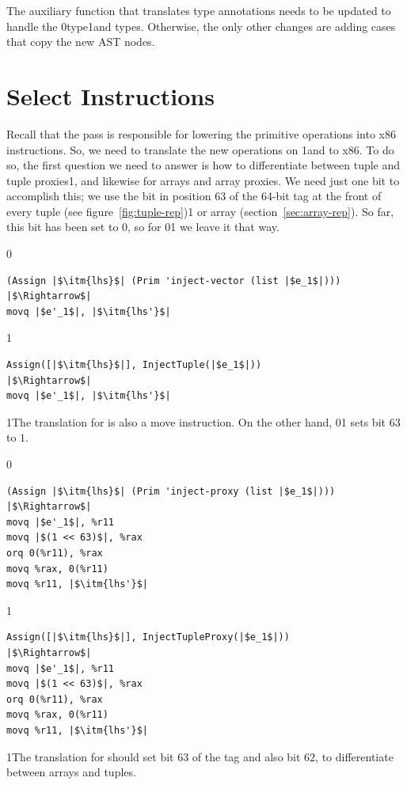 \documentclass[7x10]{TimesAPriori_MIT}%
\def\racketEd{0}
\def\pythonEd{1}
\providecommand{\BookEdition}{1}
\let\edition\BookEdition
\newcommand{\racket}[1]{{\if\edition\racketEd{#1}\fi}}
\newcommand{\pythonColor}[0]{}
\newcommand{\python}[1]{{\if\edition\pythonEd\pythonColor #1\fi}}
\numberwithin{theorem}{chapter}
\numberwithin{definition}{chapter}
\numberwithin{equation}{chapter}
\begin{document}
The auxiliary function that translates type annotations needs to be
updated to handle the \PTUPLETYNAME{}
\racket{type}\python{and \PARRAYTYNAME{} types}.
%
Otherwise, the only other changes are adding cases that copy the new
AST nodes.

\section{Select Instructions }
\label{sec:select-instructions-gradual}

Recall that the  pass is responsible for
lowering the primitive operations into x86 instructions.  So, we need
to translate the new operations on \PTUPLETYNAME{} \python{and \PARRAYTYNAME{}}
to x86.  To do so, the first question we need to answer is how to
differentiate between tuple and tuple proxies\python{, and likewise for
arrays and array proxies}.  We need just one bit to accomplish this;
we use the bit in position $63$ of the 64-bit tag at the front of
every tuple (see figure~\ref{fig:tuple-rep})\python{ or array
(section~\ref{sec:array-rep})}. So far, this bit has been set to $0$,
so for \racket{}\python{} we leave
it that way.
{\if\edition\racketEd    
\begin{lstlisting}
(Assign |$\itm{lhs}$| (Prim 'inject-vector (list |$e_1$|)))
|$\Rightarrow$|  
movq |$e'_1$|, |$\itm{lhs'}$|
\end{lstlisting}
\fi}
{\if\edition\pythonEd\pythonColor    
\begin{lstlisting}
Assign([|$\itm{lhs}$|], InjectTuple(|$e_1$|))
|$\Rightarrow$|  
movq |$e'_1$|, |$\itm{lhs'}$|
\end{lstlisting}
\fi}
\python{The translation for  is also a move instruction.}
\noindent On the other hand,
\racket{}\python{} sets bit
$63$ to $1$.
%
{\if\edition\racketEd
\begin{lstlisting}  
(Assign |$\itm{lhs}$| (Prim 'inject-proxy (list |$e_1$|)))
|$\Rightarrow$|  
movq |$e'_1$|, %r11
movq |$(1 << 63)$|, %rax
orq 0(%r11), %rax
movq %rax, 0(%r11)
movq %r11, |$\itm{lhs'}$|
\end{lstlisting}
\fi}
{\if\edition\pythonEd\pythonColor
\begin{lstlisting}  
Assign([|$\itm{lhs}$|], InjectTupleProxy(|$e_1$|))
|$\Rightarrow$|  
movq |$e'_1$|, %r11
movq |$(1 << 63)$|, %rax
orq 0(%r11), %rax
movq %rax, 0(%r11)
movq %r11, |$\itm{lhs'}$|
\end{lstlisting}
\fi}
\python{\noindent The translation for  should set bit $63$
  of the tag and also bit $62$, to differentiate between arrays and tuples.}
\end{document}
